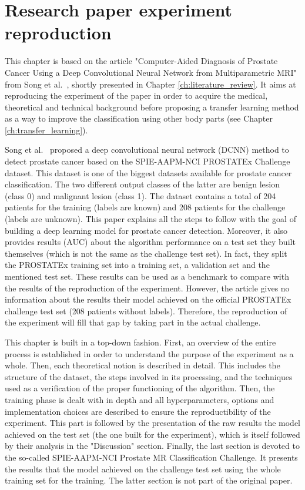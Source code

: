 
\chapter{Research paper experiment reproduction}
\label{ch:paper_reproduction}
\setlength{\marginparwidth}{3cm}\leavevmode {}This chapter is based on the article "Computer-Aided Diagnosis of Prostate Cancer Using a Deep Convolutional Neural Network from Multiparametric MRI" from Song et al.~\cite{07}, shortly presented in Chapter \ref{ch:literature_review}. It aims at reproducing the experiment of the paper in order to acquire the medical, theoretical and technical background before proposing a transfer learning method as a way to improve the classification using other body parts (see Chapter \ref{ch:transfer_learning}).

Song et al.~\cite{07} proposed a deep convolutional neural network (DCNN) method to detect prostate cancer based on the SPIE-AAPM-NCI PROSTATEx Challenge dataset. This dataset is one of the biggest datasets available for prostate cancer classification. The two different output classes of the latter are benign lesion (class 0) and malignant lesion (class 1). The dataset contains a total of 204 patients for the training (labels are known) and 208 patients for the challenge (labels are unknown). This paper explains all the steps to follow with the goal of building a deep learning model for prostate cancer detection. Moreover, it also provides results (AUC) about the algorithm performance on a test set they built themselves (which is not the same as the challenge test set). In fact, they split the PROSTATEx training set into a training set, a validation set and the mentioned test set. These results can be used as a benchmark to compare with the results of the reproduction of the experiment. However, the article gives no information about the results their model achieved on the official PROSTATEx challenge test set (208 patients without labels). Therefore, the reproduction of the experiment will fill that gap by taking part in the actual challenge.

This chapter is built in a top-down fashion. First, an overview of the entire process is established in order to understand the purpose of the experiment as a whole. Then, each theoretical notion is described in detail. This includes the structure of the dataset, the steps involved in its processing, and the techniques used as a verification of the proper functioning of the algorithm. Then, the training phase is dealt with in depth and all hyperparameters, options and implementation choices are described to ensure the reproductibility of the experiment. This part is followed by the presentation of the raw results the model achieved on the test set (the one built for the experiment), which is itself followed by their analysis in the "Discussion" section. Finally, the last section is devoted to the so-called SPIE-AAPM-NCI Prostate MR Classification Challenge. It presents the results that the model achieved on the challenge test set using the whole training set for the training. The latter section is not part of the original paper.

